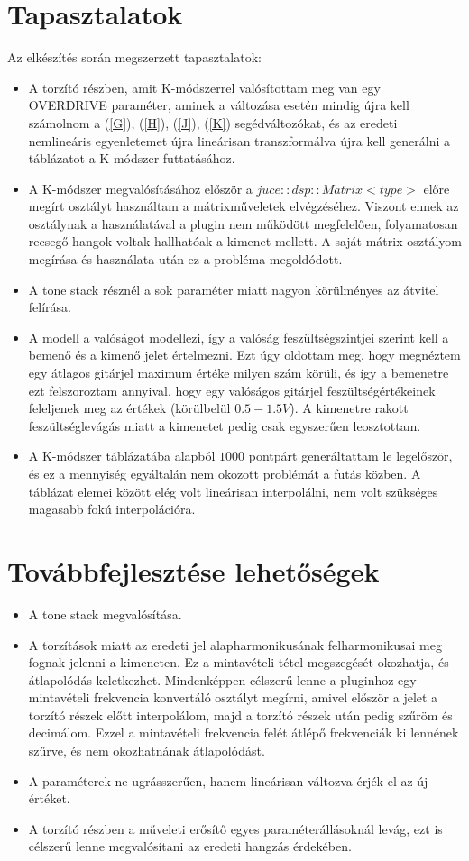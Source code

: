 \section{Tapasztalatok}
Az elkészítés során megszerzett tapasztalatok:
\begin{itemize}
    \item A torzító részben, amit K-módszerrel valósítottam meg van egy OVERDRIVE paraméter, aminek a változása esetén mindig újra kell számolnom a (\ref{G}), (\ref{H}), (\ref{J}), (\ref{K}) segédváltozókat, és az eredeti nemlineáris egyenletemet újra lineárisan transzformálva újra kell generálni 
    a táblázatot a K-módszer futtatásához.
    \item A K-módszer megvalósításához először a $juce::dsp::Matrix<type>$ előre megírt osztályt használtam a mátrixműveletek elvégzéséhez. Viszont ennek az osztálynak a használatával a plugin nem működött megfelelően, folyamatosan recsegő hangok voltak hallhatóak a kimenet mellett. A saját mátrix osztályom megírása és használata után ez a probléma megoldódott.
    \item A tone stack résznél a sok paraméter miatt nagyon körülményes az átvitel felírása.
    \item A modell a valóságot modellezi, így a valóság feszültségszintjei szerint kell a bemenő és a kimenő jelet értelmezni. Ezt úgy oldottam meg, hogy megnéztem egy átlagos gitárjel maximum értéke milyen szám körüli, és így a bemenetre ezt felszoroztam annyival, hogy egy valóságos gitárjel feszültségértékeinek feleljenek meg az értékek (körülbelül $0.5-1.5V$). A kimenetre rakott feszültséglevágás miatt a kimenetet pedig csak egyszerűen leosztottam.
    \item A K-módszer táblázatába alapból $1000$ pontpárt generáltattam le legelőször, és ez a mennyiség egyáltalán nem okozott problémát a futás közben. A táblázat elemei között elég volt lineárisan interpolálni, nem volt szükséges magasabb fokú interpolációra. 
\end{itemize}
\section{Továbbfejlesztése lehetőségek}
\begin{itemize}
    \item A tone stack megvalósítása.
    \item A torzítások miatt az eredeti jel alapharmonikusának felharmonikusai meg fognak jelenni a kimeneten. Ez a mintavételi tétel megszegését okozhatja, és átlapolódás keletkezhet. Mindenképpen célszerű lenne a pluginhoz egy mintavételi frekvencia konvertáló osztályt megírni, amivel először a jelet a torzító részek előtt interpolálom, majd a torzító részek után pedig szűröm és decimálom. Ezzel a mintavételi frekvencia felét átlépő frekvenciák ki lennének szűrve, és nem okozhatnának átlapolódást.
    \item A paraméterek ne ugrásszerűen, hanem lineárisan változva érjék el az új értéket.
    \item A torzító részben a műveleti erősítő egyes paraméterállásoknál levág, ezt is célszerű lenne megvalósítani az eredeti hangzás érdekében.
\end{itemize}